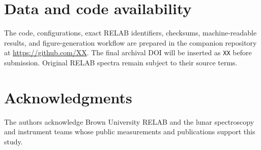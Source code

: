 \documentclass[a4paper,10pt,twocolumn]{article}
\begin{document}
\section*{Data and code availability}

The code, configurations, exact RELAB identifiers, checksums, machine-readable results, and figure-generation workflow are prepared in the companion repository at \url{https://github.com/XX}. The final archival DOI will be inserted as \texttt{XX} before submission. Original RELAB spectra remain subject to their source terms.

\section*{Acknowledgments}

The authors acknowledge Brown University RELAB and the lunar spectroscopy and instrument teams whose public measurements and publications support this study.

\balance


\end{document}

